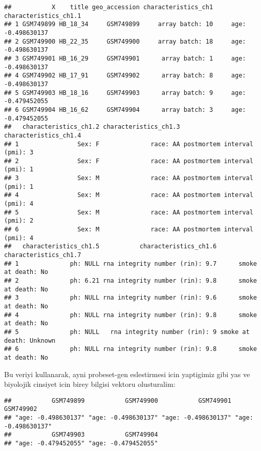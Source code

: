 \documentclass[
]{book}
\newenvironment{Shaded}{\begin{snugshade}}{\end{snugshade}}
\newcommand{\FloatTok}[1]{\textcolor[rgb]{0.00,0.00,0.81}{#1}}
\newcommand{\FunctionTok}[1]{\textcolor[rgb]{0.00,0.00,0.00}{#1}}
\newcommand{\NormalTok}[1]{#1}
\newcommand{\OtherTok}[1]{\textcolor[rgb]{0.56,0.35,0.01}{#1}}
\newcommand{\SpecialCharTok}[1]{\textcolor[rgb]{0.00,0.00,0.00}{#1}}
\begin{document}
\begin{verbatim}
##           X    title geo_accession characteristics_ch1 characteristics_ch1.1
## 1 GSM749899 HB_18_34     GSM749899     array batch: 10     age: -0.498630137
## 2 GSM749900 HB_22_35     GSM749900     array batch: 18     age: -0.498630137
## 3 GSM749901 HB_16_29     GSM749901      array batch: 1     age: -0.498630137
## 4 GSM749902 HB_17_91     GSM749902      array batch: 8     age: -0.498630137
## 5 GSM749903 HB_18_16     GSM749903      array batch: 9     age: -0.479452055
## 6 GSM749904 HB_16_62     GSM749904      array batch: 3     age: -0.479452055
##   characteristics_ch1.2 characteristics_ch1.3        characteristics_ch1.4
## 1                Sex: F              race: AA postmortem interval (pmi): 3
## 2                Sex: F              race: AA postmortem interval (pmi): 1
## 3                Sex: M              race: AA postmortem interval (pmi): 1
## 4                Sex: M              race: AA postmortem interval (pmi): 4
## 5                Sex: M              race: AA postmortem interval (pmi): 2
## 6                Sex: M              race: AA postmortem interval (pmi): 4
##   characteristics_ch1.5           characteristics_ch1.6   characteristics_ch1.7
## 1              ph: NULL rna integrity number (rin): 9.7      smoke at death: No
## 2              ph: 6.21 rna integrity number (rin): 9.8      smoke at death: No
## 3              ph: NULL rna integrity number (rin): 9.6      smoke at death: No
## 4              ph: NULL rna integrity number (rin): 9.8      smoke at death: No
## 5              ph: NULL   rna integrity number (rin): 9 smoke at death: Unknown
## 6              ph: NULL rna integrity number (rin): 9.8      smoke at death: No
\end{verbatim}

Bu veriyi kullanarak, ayni probeset-gen eslestirmesi icin yaptigimiz gibi yas ve biyolojik cinsiyet icin birey bilgisi vektoru olusturalim:

\begin{Shaded}
\end{Shaded}

\begin{verbatim}
##           GSM749899           GSM749900           GSM749901           GSM749902 
## "age: -0.498630137" "age: -0.498630137" "age: -0.498630137" "age: -0.498630137" 
##           GSM749903           GSM749904 
## "age: -0.479452055" "age: -0.479452055"
\end{verbatim}
\end{document}
